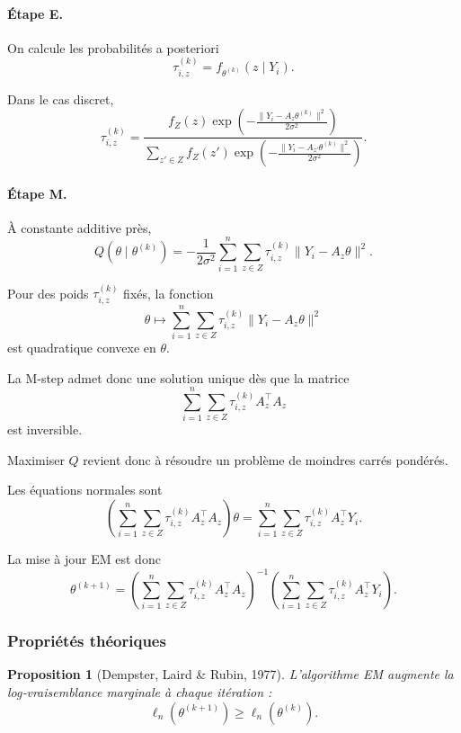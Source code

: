 \documentclass[12pt, a4paper]{article}
\newtheorem{proposition}[theorem]{Proposition}
\theoremstyle{definition}
\begin{document}
\paragraph{Étape E.}

On calcule les probabilités a posteriori
\[
\tau_{i,z}^{(k)}
=
f_{\theta^{(k)}}(z\mid Y_i).
\]

Dans le cas discret,
\[
\tau_{i,z}^{(k)}
=
\frac{
f_Z(z)
\exp\left(
-\frac{\|Y_i-A_z\theta^{(k)}\|^2}{2\sigma^2}
\right)
}{
\sum_{z'\in Z}
f_Z(z')
\exp\left(
-\frac{\|Y_i-A_{z'}\theta^{(k)}\|^2}{2\sigma^2}
\right)
}.
\]

\paragraph{Étape M.}

À constante additive près,
\[
Q(\theta\mid\theta^{(k)})
=
-
\frac{1}{2\sigma^2}
\sum_{i=1}^n
\sum_{z\in Z}
\tau_{i,z}^{(k)}
\|Y_i-A_z\theta\|^2.
\]

Pour des poids $\tau_{i,z}^{(k)}$ fixés, la fonction
\[
\theta
\longmapsto
\sum_{i=1}^n
\sum_{z\in Z}
\tau_{i,z}^{(k)}
\|Y_i-A_z\theta\|^2
\]
est quadratique convexe en $\theta$.

La M-step admet donc une solution unique dès que la matrice
\[
\sum_{i=1}^n
\sum_{z\in Z}
\tau_{i,z}^{(k)}
A_z^\top A_z
\]
est inversible.

Maximiser $Q$ revient donc à résoudre un problème de moindres carrés pondérés.

Les équations normales sont
\[
\left(
\sum_{i=1}^n
\sum_{z\in Z}
\tau_{i,z}^{(k)}
A_z^\top A_z
\right)\theta
=
\sum_{i=1}^n
\sum_{z\in Z}
\tau_{i,z}^{(k)}
A_z^\top Y_i.
\]

La mise à jour EM est donc
\[
\theta^{(k+1)}
=
\left(
\sum_{i=1}^n
\sum_{z\in Z}
\tau_{i,z}^{(k)}
A_z^\top A_z
\right)^{-1}
\left(
\sum_{i=1}^n
\sum_{z\in Z}
\tau_{i,z}^{(k)}
A_z^\top Y_i
\right).
\]

\subsubsection{Propriétés théoriques}

\begin{proposition}[Dempster, Laird \& Rubin, 1977]
L’algorithme EM augmente la log‑vraisemblance marginale à chaque itération :
\[
\ell_n(\theta^{(k+1)}) \ge \ell_n(\theta^{(k)}).
\]
\end{proposition}
\end{document}

